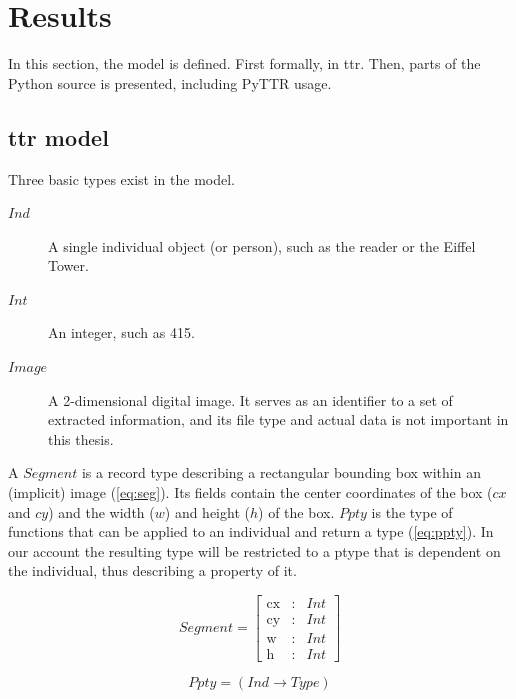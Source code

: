\section{Results}
\label{sec:results}

In this section, the model is defined.
First formally, in \gls{ttr}.
Then, parts of the Python source is presented, including PyTTR usage.



\subsection{\Acrshort{ttr} model}
\label{ssec:ttrmodel}

Three basic types exist in the model.

\begin{description}
\item [$Ind$] A single individual object (or person), such as the reader or the Eiffel Tower.
\item [$Int$] An integer, such as 415.
\item [$Image$] A 2-dimensional digital image. It serves as an identifier to a set of extracted information, and its file type and actual data is not important in this thesis.
\end{description}

A $Segment$ is a record type describing a rectangular bounding box within an (implicit) image (\autoref{eq:seg}).
Its fields contain the center coordinates of the box ($cx$ and $cy$) and the width ($w$) and height ($h$) of the box.
$Ppty$ is the type of functions that can be applied to an individual and return a type (\autoref{eq:ppty}).
In our account the resulting type will be restricted to a ptype that is dependent on the individual, thus describing a property of it.

\begin{equation}\label{eq:seg}
Segment = \left[\begin{array}{rcl}
\text{cx} &:& Int\\
\text{cy} &:& Int\\
\text{w} &:& Int\\
\text{h} &:& Int
\end{array}\right]\end{equation}

\begin{equation}\label{eq:ppty}
Ppty = (Ind \rightarrow Type)\end{equation}


